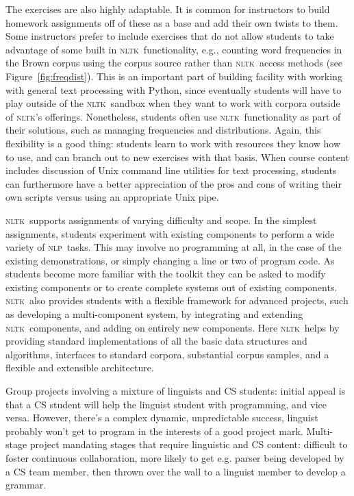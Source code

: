 \documentclass[11pt]{article}
\newcommand{\NLP}{\textsc{nlp}}
\newcommand{\NLTK}{\textsc{nltk}}
\begin{document}
The exercises are also highly adaptable. It is common for instructors
to build homework assignments off of these as a base and add their own
twists to them. 
Some instructors prefer to include exercises that do not allow students
to take advantage of some built in \NLTK\ functionality, e.g., counting
word frequencies in the Brown corpus using the corpus source rather
than \NLTK\ access methods (see Figure~\ref{fig:freqdist}).  This is an important part of building
facility with working with general text processing with Python, since
eventually students will have to play outside of the \NLTK\ sandbox when
they want to work with corpora outside of \NLTK's
offerings. Nonetheless, students often use \NLTK\ functionality as part
of their solutions, such as managing frequencies and
distributions. Again, this flexibility is a good thing: students learn
to work with resources they know how to use, and can branch out to new
exercises with that basis. When course content includes discussion of
Unix command line utilities for text processing, students can
furthermore have a better appreciation of the pros and cons of writing
their own scripts versus using an appropriate Unix pipe.


\NLTK\ supports assignments of varying difficulty and scope. In the
simplest assignments, students experiment with existing components to
perform a wide variety of \NLP\ tasks. This may involve no programming
at all, in the case of the existing demonstrations, or simply changing
a line or two of program code. As students become more familiar with
the toolkit they can be asked to modify existing components or to
create complete systems out of existing components. \NLTK\ also provides
students with a flexible framework for advanced projects, such as
developing a multi-component system, by integrating and extending \NLTK\
components, and adding on entirely new components. Here \NLTK\ helps by
providing standard implementations of all the basic data structures
and algorithms, interfaces to standard corpora, substantial corpus
samples, and a flexible and extensible architecture.


Group projects involving a mixture of linguists and CS students:
initial appeal is that a CS student will help the linguist student with programming,
and vice versa.  However, there's a
complex dynamic, unpredictable success, linguist probably won't get to program
in the interests of a good project mark.
Multi-stage project mandating stages that require linguistic and CS content: difficult
to foster continuous collaboration, more likely to get e.g. parser being developed by
a CS team member, then thrown over the wall to a linguist member to develop a grammar.
\end{document}
